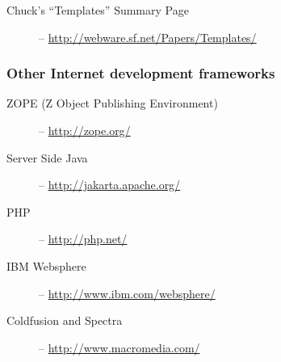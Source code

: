 \begin{description}
\item[Chuck's ``Templates'' Summary Page] -- \url{http://webware.sf.net/Papers/Templates/}
\end{description}

\subsubsection{Other Internet development frameworks}
\label{links.other}

\begin{description}
\item[ZOPE (Z Object Publishing Environment)] -- \url{http://zope.org/}
\item[Server Side Java] -- \url{http://jakarta.apache.org/}
\item[PHP] -- \url{http://php.net/}
\item[IBM Websphere] -- \url{http://www.ibm.com/websphere/}
\item[Coldfusion and Spectra] -- \url{http://www.macromedia.com/}
\end{description}

